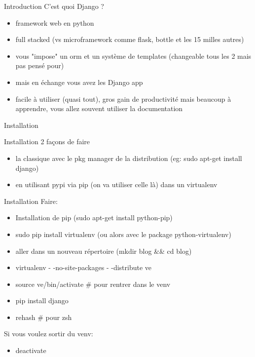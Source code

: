 \documentclass{beamer}
\begin{document}
\begin{frame}{Introduction}
    \vspace{3mm}
    C'est quoi Django ?
    \begin{itemize}
        \item framework web en python\pause
        \item full stacked (vs microframework comme flask, bottle et les 15 milles autres)\pause
        \item vous "impose" un orm et un système de templates (changeable tous les 2 mais pas pensé pour)\pause
        \item mais en échange vous avez les Django app\pause
        \item facile à utiliser (quasi tout), gros gain de productivité mais beaucoup à apprendre, vous allez souvent utiliser la documentation
    \end{itemize}
\end{frame}

\begin{frame}[fragile]{}
\begin{LARGE}
\begin{center}
Installation
\end{center}
\end{LARGE}
\end{frame}

\begin{frame}{Installation}
2 façons de faire
\begin{itemize}
    \item la classique avec le pkg manager de la distribution (eg: sudo apt-get install django)
    \item en utilisant pypi via pip (on va utiliser celle là) dans un virtualenv
\end{itemize}
\end{frame}

\begin{frame}{Installation}
    Faire:
    \begin{itemize}
        \item Installation de pip (sudo apt-get install python-pip)\pause
        \item sudo pip install virtualenv (ou alors avec le package python-virtualenv)\pause
        \item aller dans un nouveau répertoire (mkdir blog \&\& cd blog)\pause
        \item virtualenv - -no-site-packages - -distribute ve\pause
        \item source ve/bin/activate \# pour rentrer dans le venv\pause
        \item pip install django\pause
        \item rehash \# pour zsh
    \end{itemize}
    \vspace{3mm}
    \pause
    Si vous voulez sortir du venv:
    \begin{itemize}
        \item deactivate
    \end{itemize}
\end{frame}
\end{document}

